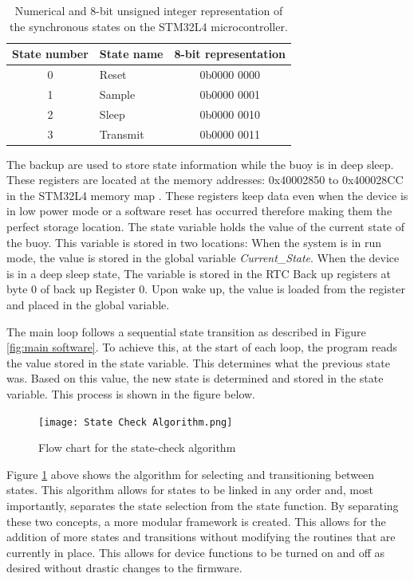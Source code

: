 \begin{table}[H]
	\centering
	\caption{Numerical and 8-bit unsigned integer representation of the synchronous states on the STM32L4 microcontroller.}
	\label{tab:state_bit}
	\setlength{\textwidth}{5pt}
	\begin{tabular}{clc}
		\hline
		\textbf{State number} & \textbf{State name} & \textbf{8-bit representation}\\
		\hline
		\hline
		0 &Reset 	&  	0b0000 0000\\
		\hline
		1 &Sample 	& 	0b0000 0001\\ 
		\hline
		2 &Sleep 	&  	0b0000 0010\\
		\hline
		3 &Transmit & 	0b0000 0011\\
		\hline
		\hline
	\end{tabular}
\end{table}

The backup are used to store state information while the buoy is in deep sleep. These  registers are located at the memory addresses: 0x40002850 to 0x400028CC in the STM32L4 memory map \cite{stm32l4ref}. These registers keep data even when the device is in low power mode or a software reset has occurred therefore making them the perfect storage location. The state variable holds the value of the current state of the buoy. This variable is stored in two locations: When the system is in run mode, the value is stored in the global variable \textit{Current\_State}. When the device is in a deep sleep state, The variable is stored in the RTC Back up registers at byte 0 of back up Register 0. Upon wake up, the value is loaded from the register and placed in the global variable.

The main loop follows a sequential state transition as described in Figure \ref{fig:main software}. To achieve this, at the start of each loop, the program reads the value stored in the state variable. This determines what the previous state was. Based on this value, the new state is determined and stored in the state variable. This process is shown in the figure below.

\begin{figure}[H]
	\centering
	\texttt{[image: State Check Algorithm.png]}
	\caption{Flow chart for the state-check algorithm}
	\label{fig:state_check}
\end{figure}

Figure \ref{fig:state_check} above shows the algorithm for selecting and transitioning between states. This algorithm allows for states to be linked in any order and, most importantly, separates the state selection from the state function. By separating these two concepts, a more modular framework is created. This allows for the addition of more states and transitions without modifying the routines that are currently in place. This allows for device functions to be turned on and off as desired without drastic changes to the firmware.

